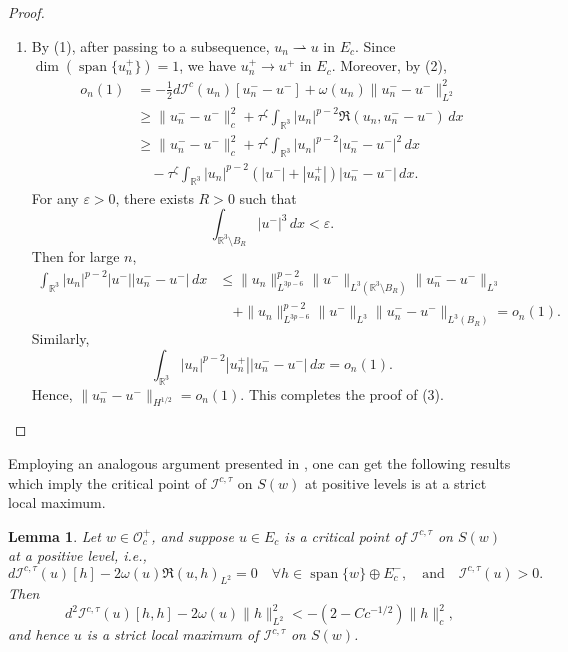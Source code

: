\documentclass{amsart}
\theoremstyle{plain}
\newtheorem{lemma}[theorem]{Lemma}
\theoremstyle{definition}
\theoremstyle{remark}
\numberwithin{equation}{section} \numberwithin{figure}{section}
\begin{document}
\begin{proof}
\begin{enumerate}
      \item[(3)] By (1), after passing to a subsequence, \( u_n \rightharpoonup u \) in \( E_c \). Since \( \dim(\operatorname{span}\{u_n^+\}) = 1 \), we have \( u_n^+ \to u^+ \) in \( E_c \). Moreover, by (2),
            \[
            \begin{aligned}
              o_n(1) &= -\frac{1}{2} d\mathcal{I}^c(u_n)[u_n^- - u^-] + \omega(u_n) \|u_n^- - u^-\|_{L^2}^2 \\
              &\geq \|u_n^- - u^-\|_c^2 + \tau^{\zeta} \int_{\mathbb{R}^3} |u_n|^{p-2} \Re(u_n, u_n^- - u^-) \, dx \\
              &\geq \|u_n^- - u^-\|_c^2 + \tau^{\zeta} \int_{\mathbb{R}^3} |u_n|^{p-2} |u_n^- - u^-|^2 \, dx \\
              &\quad - \tau^{\zeta} \int_{\mathbb{R}^3} |u_n|^{p-2} (|u^-| + |u_n^+|) |u_n^- - u^-| \, dx.
            \end{aligned}
            \]
            For any \( \varepsilon > 0 \), there exists \( R > 0 \) such that
            \[
            \int_{\mathbb{R}^3 \setminus B_R} |u^-|^3 \, dx < \varepsilon.
            \]
            Then for large \( n \),
            \[
            \begin{split}
              \int_{\mathbb{R}^3} |u_n|^{p-2} |u^-| |u_n^- - u^-| \, dx 
              &\leq \|u_n\|_{L^{3p-6}}^{p-2} \|u^-\|_{L^3(\mathbb{R}^3 \setminus B_R)} \|u_n^- - u^-\|_{L^3} \\
              &\quad + \|u_n\|_{L^{3p-6}}^{p-2} \|u^-\|_{L^3} \|u_n^- - u^-\|_{L^3(B_R)} = o_n(1).
            \end{split}
            \]
            Similarly,
            \[
            \int_{\mathbb{R}^3} |u_n|^{p-2} |u_n^+| |u_n^- - u^-| \, dx = o_n(1).
            \]
            Hence, \( \|u_n^- - u^-\|_{H^{1/2}} = o_n(1) \). This completes the proof of (3).\qedhere
    \end{enumerate}
    \end{proof}
    

Employing an analogous argument presented in \cite[Proposition 3.2]{Nolasco}, one can get the following results which imply  
the critical point of $ \mathcal{I}^{c, \tau }$ on $S(w)$ at positive levels is at a strict local maximum.
\begin{lemma}\label{lemm:3.1}
  Let \( w \in \mathcal{O}_c^+ \), and suppose \( u \in E_c \) is a critical point of \( \mathcal{I}^{c,\tau} \) on \( S(w) \) at a positive level, i.e.,
  \[
  d\mathcal{I}^{c,\tau}(u)[h] - 2\omega(u) \Re(u, h)_{L^2} = 0 \quad \forall h \in \operatorname{span}\{w\} \oplus E_c^-, \quad \text{and} \quad \mathcal{I}^{c,\tau}(u) > 0.
  \]
  Then
  \[
  d^2\mathcal{I}^{c,\tau}(u)[h, h] - 2\omega(u) \|h\|_{L^2}^2 < -(2 - C c^{-1/2}) \|h\|_c^2,
  \]
  and hence \( u \) is a strict local maximum of \( \mathcal{I}^{c,\tau} \) on \( S(w) \).
  \end{lemma}
  
\end{document}
